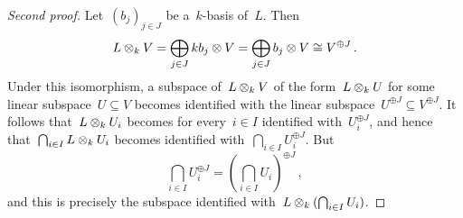 \begin{proof}[Second proof]
  Let~$(b_j)_{j \in J}$ be a~$k$-basis of~$L$.
  Then
  \[
          L \mathbin{\otimes}_k V
    =     \bigoplus_{j \in J} k b_j \mathbin{\otimes} V
    =     \bigoplus_{j \in J} b_j \mathbin{\otimes} V
    \cong V^{\oplus J} \,.
  \]
  Under this isomorphism, a subspace of~$L \mathbin{\otimes}_k V$ of the form~$L \mathbin{\otimes}_k U$ for some linear subspace~$U \subseteq V$ becomes identified with the linear subspace~$U^{\oplus J} \subseteq V^{\oplus J}$.
  It follows that~$L \mathbin{\otimes}_k U_i$ becomes for every~$i \in I$ identified with~$U_i^{\oplus J}$, and hence that~$\bigcap_{i \in I} L \mathbin{\otimes}_k U_i$ becomes identified with~$\bigcap_{i \in I} U_i^{\oplus J}$.
  But
  \[
      \bigcap_{i \in I} U_i^{\oplus J}
    = \left( \bigcap_{i \in I} U_i \right)^{\oplus J} \,,
  \]
  and this is precisely the subspace identified with~$L \mathbin{\otimes}_k (\bigcap_{i \in I} U_i)$.
\end{proof}




